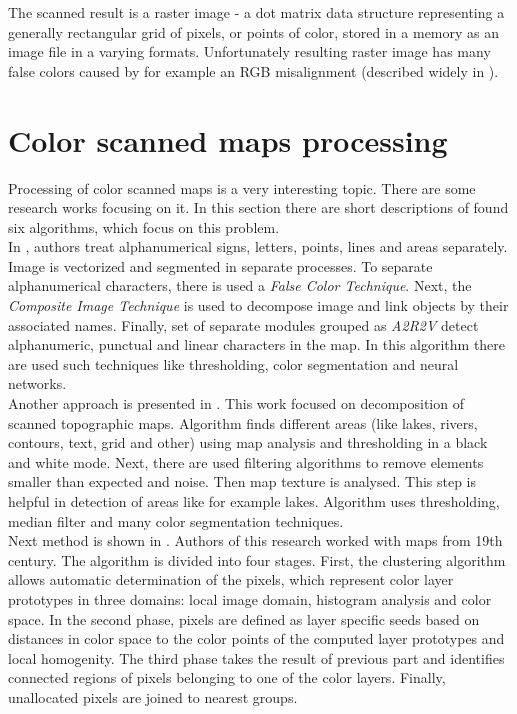 \documentclass[a4paper,onecolumn,oneside,12pt]{memoir}
\begin{document}
The scanned result is a raster image - a dot matrix data structure representing a generally
rectangular grid of pixels, or points of color, stored in a memory as an image file in a varying
formats. Unfortunately resulting raster image has many false colors caused by for example an RGB
misalignment (described widely in \cite{colorMapSegmentation}).

\section{Color scanned maps processing}

Processing of color scanned maps is a very interesting topic. There are some research works focusing
on it. In this section there are short descriptions of found six algorithms, which focus on this
problem. \\

In \cite{semanticAnalysisAndRecognition}, authors treat alphanumerical signs, letters, points, lines
and areas separately. Image is vectorized and segmented in separate processes. To separate 
alphanumerical characters, there is used a \textit{False Color Technique}. Next, the 
\textit{Composite Image Technique} is used to decompose image and link objects by their associated
names. Finally, set of separate modules grouped as \textit{A2R2V} detect alphanumeric, punctual and
linear characters in the map. In this algorithm there are used such techniques like thresholding,
color segmentation and neural networks. \\

Another approach is presented in \cite{comparativeAnalysisOfScannedMaps}. This work focused on 
decomposition of scanned topographic maps. Algorithm finds different areas (like lakes, rivers,
contours, text, grid and other) using map analysis and thresholding in a black and white mode.
Next, there are used filtering algorithms to remove elements smaller than expected and noise.
Then map texture is analysed. This step is helpful in detection of areas like for example lakes.
Algorithm uses thresholding, median filter and many color segmentation techniques. \\

Next method is shown in \cite{colorsOfThePast}. Authors of this research worked with maps from 
19th century. The algorithm is divided into four stages. First, the clustering algorithm allows 
automatic determination of the pixels, which represent color layer prototypes in three domains:
local image domain, histogram analysis and color space. In the second phase, pixels are defined as
layer specific seeds based on distances in color space to the color points of the computed layer 
prototypes and local homogenity. The third phase takes the result of previous part and identifies 
connected regions of pixels belonging to one of the color layers. Finally, unallocated pixels are
joined to nearest groups. \\
\end{document}
